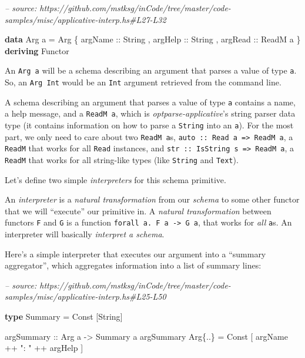 \documentclass[]{article}
\newenvironment{Shaded}{}{}
\newcommand{\CommentTok}[1]{\textcolor[rgb]{0.38,0.63,0.69}{\textit{#1}}}
\newcommand{\DataTypeTok}[1]{\textcolor[rgb]{0.56,0.13,0.00}{#1}}
\newcommand{\KeywordTok}[1]{\textcolor[rgb]{0.00,0.44,0.13}{\textbf{#1}}}
\newcommand{\NormalTok}[1]{#1}
\newcommand{\OperatorTok}[1]{\textcolor[rgb]{0.40,0.40,0.40}{#1}}
\newcommand{\OtherTok}[1]{\textcolor[rgb]{0.00,0.44,0.13}{#1}}
\newcommand{\StringTok}[1]{\textcolor[rgb]{0.25,0.44,0.63}{#1}}
\begin{document}
\begin{Shaded}
\begin{Highlighting}[]
\CommentTok{-- source: https://github.com/mstksg/inCode/tree/master/code-samples/misc/applicative-interp.hs#L27-L32}

\KeywordTok{data} \DataTypeTok{Arg}\NormalTok{ a }\OtherTok{=} \DataTypeTok{Arg}
\NormalTok{    \{}\OtherTok{ argName  ::} \DataTypeTok{String}
\NormalTok{    ,}\OtherTok{ argHelp  ::} \DataTypeTok{String}
\NormalTok{    ,}\OtherTok{ argRead  ::} \DataTypeTok{ReadM}\NormalTok{ a}
\NormalTok{    \}}
  \KeywordTok{deriving} \DataTypeTok{Functor}
\end{Highlighting}
\end{Shaded}

An \texttt{Arg\ a} will be a schema describing an argument that parses a value
of type \texttt{a}. So, an \texttt{Arg\ Int} would be an \texttt{Int} argument
retrieved from the command line.

A schema describing an argument that parses a value of type \texttt{a} contains
a name, a help message, and a \texttt{ReadM\ a}, which is
\emph{optparse-applicative}'s string parser data type (it contains information
on how to parse a \texttt{String} into an \texttt{a}). For the most part, we
only need to care about two \texttt{ReadM\ a}s,
\texttt{auto\ ::\ Read\ a\ =\textgreater{}\ ReadM\ a}, a \texttt{ReadM} that
works for all \texttt{Read} instances, and
\texttt{str\ ::\ IsString\ s\ =\textgreater{}\ ReadM\ a}, a \texttt{ReadM} that
works for all string-like types (like \texttt{String} and \texttt{Text}).

Let's define two simple \emph{interpreters} for this schema primitive.

An \emph{interpreter} is a \emph{natural transformation} from our \emph{schema}
to some other functor that we will ``execute'' our primitive in. A \emph{natural
transformation} between functors \texttt{F} and \texttt{G} is a function
\texttt{forall\ a.\ F\ a\ -\textgreater{}\ G\ a}, that works for \emph{all}
\texttt{a}s. An interpreter will basically \emph{interpret a schema}.

Here's a simple interpreter that executes our argument into a ``summary
aggregator'', which aggregates information into a list of summary lines:

\begin{Shaded}
\begin{Highlighting}[]
\CommentTok{-- source: https://github.com/mstksg/inCode/tree/master/code-samples/misc/applicative-interp.hs#L25-L50}

\KeywordTok{type} \DataTypeTok{Summary} \OtherTok{=} \DataTypeTok{Const}\NormalTok{ [}\DataTypeTok{String}\NormalTok{]}

\OtherTok{argSummary ::} \DataTypeTok{Arg}\NormalTok{ a }\OtherTok{->} \DataTypeTok{Summary}\NormalTok{ a}
\NormalTok{argSummary }\DataTypeTok{Arg}\NormalTok{\{}\OperatorTok{..}\NormalTok{\} }\OtherTok{=} \DataTypeTok{Const}\NormalTok{ [ argName }\OperatorTok{++} \StringTok{": "} \OperatorTok{++}\NormalTok{ argHelp ]}
\end{Highlighting}
\end{Shaded}
\end{document}
